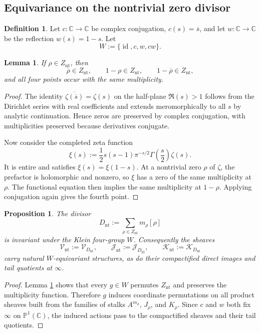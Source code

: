 \documentclass[11pt,a4paper]{article}
\newtheorem{proposition}[theorem]{Proposition}
\newtheorem{lemma}[theorem]{Lemma}
\theoremstyle{definition}
\newtheorem{definition}[theorem]{Definition}
\theoremstyle{remark}
\newcommand{\CC}{\mathbb C}
\newcommand{\PP}{\mathbb P}
\newcommand{\Vnt}{\mathcal V_{\mathrm{nt}}}
\newcommand{\Jnt}{\mathcal J_{\mathrm{nt}}}
\newcommand{\Knt}{\mathcal K_{\mathrm{nt}}}
\begin{document}
\subsection{Equivariance on the nontrivial zero divisor}

\begin{definition}
Let $c:\CC\to\CC$ be complex conjugation, $c(s)=\overline s$, and let $w:\CC\to\CC$ be the reflection $w(s)=1-s$.  Let
\[
W:=\{\operatorname{id},c,w,cw\}.
\]
\end{definition}

\begin{lemma}\label{lem:nontrivial-symmetry}
If $\rho\in Z_{\mathrm{nt}}$, then
\[
\overline\rho\in Z_{\mathrm{nt}},
\qquad
1-\rho\in Z_{\mathrm{nt}},
\qquad
1-\overline\rho\in Z_{\mathrm{nt}},
\]
and all four points occur with the same multiplicity.
\end{lemma}

\begin{proof}
The identity $\overline{\zeta(\overline s)}=\zeta(s)$ on the half-plane $\Re(s)>1$ follows from the Dirichlet series with real coefficients and extends meromorphically to all $s$ by analytic continuation.  Hence zeros are preserved by complex conjugation, with multiplicities preserved because derivatives conjugate.

Now consider the completed zeta function
\[
\xi(s):=\frac12 s(s-1)\pi^{-s/2}\Gamma\!\left(\frac s2\right)\zeta(s).
\]
It is entire and satisfies $\xi(s)=\xi(1-s)$.  At a nontrivial zero $\rho$ of $\zeta$, the prefactor is holomorphic and nonzero, so $\xi$ has a zero of the same multiplicity at $\rho$.  The functional equation then implies the same multiplicity at $1-\rho$.  Applying conjugation again gives the fourth point.
\end{proof}

\begin{proposition}\label{prop:equivariant-sheaves}
The divisor
\[
D_{\mathrm{nt}}:=\sum_{\rho\in Z_{\mathrm{nt}}}m_\rho[\rho]
\]
is invariant under the Klein four-group $W$.  Consequently the sheaves
\[
\Vnt:=\mathcal V_{D_{\mathrm{nt}}},
\qquad
\Jnt:=\mathcal J_{D_{\mathrm{nt}}},
\qquad
\Knt:=\mathcal K_{D_{\mathrm{nt}}}
\]
carry natural $W$-equivariant structures, as do their compactified direct images and tail quotients at $\infty$.
\end{proposition}

\begin{proof}
Lemma \ref{lem:nontrivial-symmetry} shows that every $g\in W$ permutes $Z_{\mathrm{nt}}$ and preserves the multiplicity function.  Therefore $g$ induces coordinate permutations on all product sheaves built from the families of stalks $A^{m_\rho}$, $J_\rho$, and $K_\rho$.  Since $c$ and $w$ both fix $\infty$ on $\PP^1(\CC)$, the induced actions pass to the compactified sheaves and their tail quotients.
\end{proof}
\end{document}

